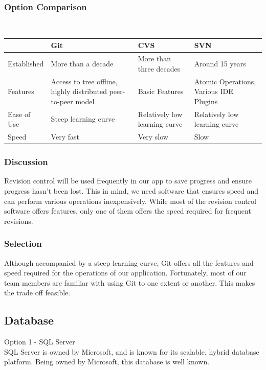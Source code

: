\documentclass[onecolumn, draftclsnofoot,10pt, compsoc]{IEEEtran}
\begin{document}
{\subsubsection{Option Comparison} ~\\
\tablehead{}
\begin{supertabular}{|p{2.5cm}|p{4.5cm}|p{4.5cm}|p{4.5cm}|}
\hline
	\cite{JaxEnter} 
	& Git
	& CVS
	& SVN\\ 
\hline
	Established 
	& More than a decade 
	& More than three decades 
	& Around 15 years\\ 
\hline
	Features 
	& Access to tree offline, highly distributed peer-to-peer model 
	& Basic Features 
	& Atomic Operations, Various IDE Plugins \\ 
\hline
	Ease of Use 
	& Steep learning curve 
	& Relatively low learning curve 
	& Relatively low learning curve \\ 
\hline
	Speed 
	& Very fast 
	& Very slow 
	& Slow \\ 
\hline
\end{supertabular}

\medskip

\subsubsection{Discussion}
{\noindent Revision control will be used frequently in our app to save progress and ensure progress hasn't been lost.
This in mind, we need software that ensures speed and can perform various operations inexpensively.
While most of the revision control software offers features, only one of them offers the speed required for frequent revisions. \par}

\medskip
\subsubsection{Selection}
{\noindent Although accompanied by a steep learning curve, Git offers all the features and speed required for the operations of our application.
Fortunately, most of our team members are familiar with using Git to one extent or another. This makes the trade off feasible. \par}







\newpage
\subsection{Database}
\noindent Option 1 - SQL Server \\
\noindent SQL Server is owned by Microsoft, and is known for its scalable, hybrid database platform. Being owned by Microsoft, this database is well known. \cite{SQLServer} 

}
\end{document}
